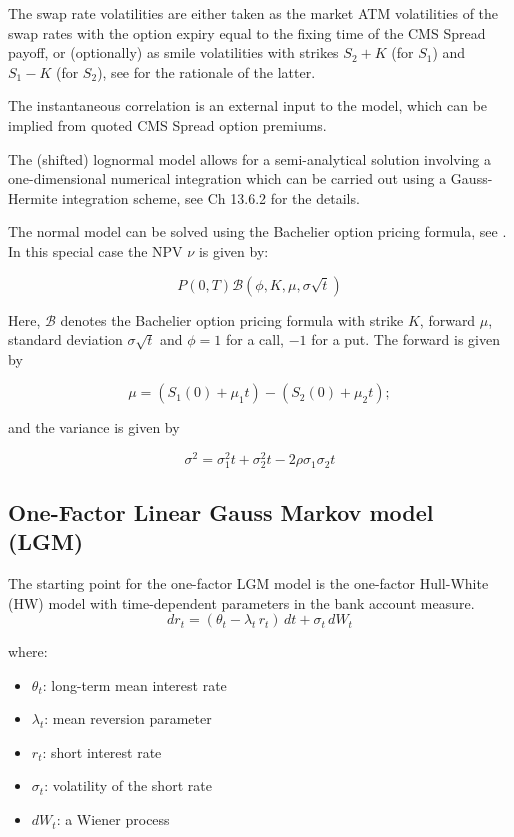 The swap rate volatilities are either taken as the market ATM volatilities of
the swap rates with the option expiry equal to the fixing time of the CMS Spread
payoff, or (optionally) as smile volatilities with strikes $S_2+K$ (for $S_1$) and
$S_1-K$ (for $S_2$), see \cite{Berrahoui_2004} for the rationale of the latter.

The instantaneous correlation is an external input to the model, which can be
implied from quoted CMS Spread option premiums.

The (shifted) lognormal model allows for a semi-analytical solution involving
a one-dimensional numerical integration which can be carried out using a
Gauss-Hermite integration scheme, see \cite{Brigo_Mercurio_2006} Ch 13.6.2 for
the details.

The normal model can be solved using the Bachelier option pricing formula, see \cite{Caspers_2015}. In this special case
the NPV $\nu$ is given by:

\begin{equation}
P(0,T) \mathcal{B}(\phi, K, \mu, \sigma\sqrt{t})
\end{equation}

Here, $\mathcal{B}$ denotes the Bachelier option pricing formula with strike $K$, forward $\mu$, standard deviation
$\sigma\sqrt{t}$ and $\phi=1$ for a call, $-1$ for a put. The forward is given by

\begin{equation}
\mu = (S_1(0)+\mu_1t) - (S_2(0) + \mu_2t);
\end{equation}

and the variance is given by

\begin{equation}
\sigma^2 = \sigma_1^2t + \sigma_2^2t - 2 \rho\sigma_1\sigma_2t
\end{equation}


\subsection{One-Factor Linear Gauss Markov model (LGM)}
\label{models:LGM}

The starting point for the one-factor LGM model is the one-factor Hull-White (HW)
model with time-dependent parameters in the bank account measure.
$$
dr_t = (\theta_t-\lambda_t \,r_t)\,dt + \sigma_t\, dW_t
$$

where:
\begin{itemize}
\item $\theta_t$: long-term mean interest rate
\item $\lambda_t$: mean reversion parameter
\item $r_t$: short interest rate
\item $\sigma_t$: volatility of the short rate
\item $dW_t$: a Wiener process
\end{itemize}

